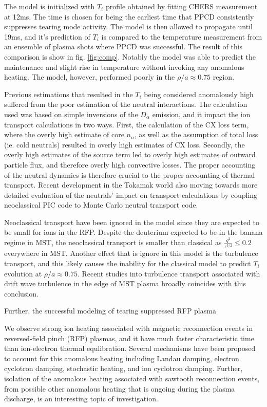 \documentclass[aip, pop, preprint]{revtex4-1}
\begin{document}
The model is initialized with $T_i$ profile obtained by fitting CHERS
measurement at 12ms. The time is chosen for being the earliest time that PPCD
consistently suppresses tearing mode activity. The model is then allowed to
propagate until 19ms, and it's prediction of $T_i$ is compared to the
temperature measurement from an ensemble of plasma shots where PPCD was
successful. The result of this comparison is show in fig. \ref{fig:comp}.
Notably the model was able to predict the maintenance and slight rise in
temperature without invoking any anomalous heating. The model, however,
performed poorly in the $\rho /a \approx 0.75$ region.

Previous estimations that resulted in the $T_i$ being considered anomalously
high suffered from the poor estimation of the neutral
interactions\cite{Fiksel2006Confinement}. The calculation used was based on
simple inversions of the $D_{\alpha}$ emission, and it impact the ion transport
calculations in two ways. First, the calculation of the CX loss term, where the
overly high estimate of core $n_n$, as well as the assumption of total loss
(ie. cold neutrals) resulted in overly high estimates of CX loss. Secondly, the
overly high estimates of the source term led to overly high estimates of
outward particle flux, and therefore overly high convective losses. The proper
accounting of the neutral dynamics is therefore crucial to the proper
accounting of thermal transport. Recent development in the Tokamak world also
moving towards more detailed evaluation of the neutrals' impact on transport
calculations by coupling neoclassical PIC code to Monte Carlo neutral transport
code\cite{Stotler2013PedestalCode}.

Neoclassical transport have been ignored in the model since they are expected
to be small for ions in the RFP. Despite the deuterium expected to be in the
banana regime\cite{Kumar12pop} in MST, the neoclassical transport is smaller
than classical as $\frac{q^2}{\epsilon^{3/2}} \leq 0.2$ everywhere in MST.
Another effect that is ignore in this model is the turbulence transport, and
this likely causes the inability for the classical model to predict $T_i$
evolution at $\rho /a \approx 0.75$. Recent studies into turbulence transport
associated with drift wave turbulence in the edge of MST plasma broadly
coincides with this conclusion\cite{NishizawaPRL}.

Further, the successful modeling of tearing suppressed RFP plasma  

We observe strong ion heating associated with magnetic reconnection events in
reversed-field pinch (RFP) plasmas\cite{Gangadhara08}, and it have much faster
characteristic time than ion-electron thermal equlibration. Several mechanisms
have been proposed to account for this anomalous heating including Landau
damping, electron cyclotron damping, stochastic heating, and ion cyclotron
damping\cite{Tangri08}. Further, isolation of the anomalous heating associated
with sawtooth reconnection events, from possible other anomalous heating that
is ongoing during the plasma discharge, is an interesting topic of
investigation. 
\end{document}
